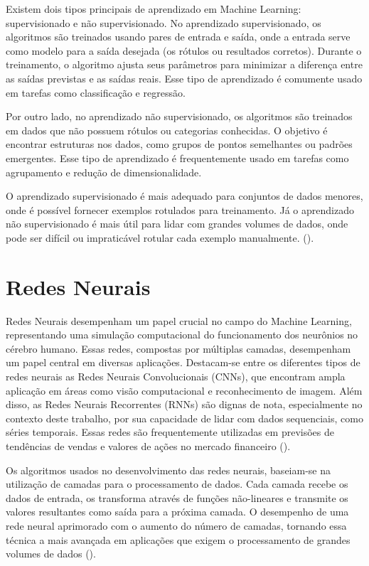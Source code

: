 Existem dois tipos principais de aprendizado em Machine Learning: supervisionado e não supervisionado. No aprendizado supervisionado, os algoritmos são treinados usando pares de entrada e saída, onde a entrada serve como modelo para a saída desejada (os rótulos ou resultados corretos). Durante o treinamento, o algoritmo ajusta seus parâmetros para minimizar a diferença entre as saídas previstas e as saídas reais. Esse tipo de aprendizado é comumente usado em tarefas como classificação e regressão.

Por outro lado, no aprendizado não supervisionado, os algoritmos são treinados em dados que não possuem rótulos ou categorias conhecidas. O objetivo é encontrar estruturas nos dados, como grupos de pontos semelhantes ou padrões emergentes. Esse tipo de aprendizado é frequentemente usado em tarefas como agrupamento e redução de dimensionalidade.

O aprendizado supervisionado é mais adequado para conjuntos de dados menores, onde é possível fornecer exemplos rotulados para treinamento. Já o aprendizado não supervisionado é mais útil para lidar com grandes volumes de dados, onde pode ser difícil ou impraticável rotular cada exemplo manualmente. (\cite{Mahesh2018}).


\section{Redes Neurais}

Redes Neurais desempenham um papel crucial no campo do Machine Learning, representando uma simulação computacional do funcionamento dos neurônios no cérebro humano. Essas redes, compostas por múltiplas camadas, desempenham um papel central em diversas aplicações. Destacam-se entre os diferentes tipos de redes neurais as Redes Neurais Convolucionais (CNNs), que encontram ampla aplicação em áreas como visão computacional e reconhecimento de imagem. Além disso, as Redes Neurais Recorrentes (RNNs) são dignas de nota, especialmente no contexto deste trabalho, por sua capacidade de lidar com dados sequenciais, como séries temporais. Essas redes são frequentemente utilizadas em previsões de tendências de vendas e valores de ações no mercado financeiro (\cite{IBM2020}).
\par Os algoritmos usados no desenvolvimento das redes neurais, baseiam-se na utilização de camadas para o processamento de dados. Cada camada recebe os dados de entrada, os transforma através de funções não-lineares e transmite os valores resultantes como saída para a próxima camada. O desempenho de uma rede neural aprimorado com o aumento do número de camadas, tornando essa técnica a mais avançada em aplicações que exigem o processamento de grandes volumes de dados (\cite{Chassagnon2020}).

